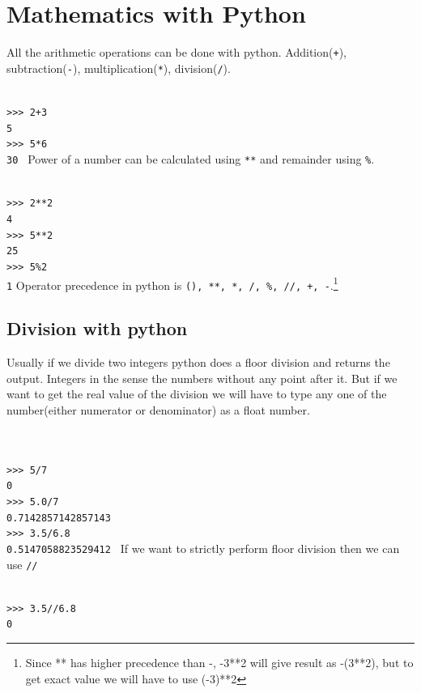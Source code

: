 \documentclass[12pt,a4paper]{article}
\begin{document}
\section{Mathematics with Python}

All the arithmetic operations can be done with python. Addition(\texttt{+}), subtraction(\texttt{-}), multiplication(\texttt{*}), division(\texttt{/}).

\texttt{\\
>>> 2+3\\
5\\
>>> 5*6\\
30
}
\linebreak
\linebreak
Power of a number can be calculated using \texttt{**} and remainder using \texttt{\%}.

\texttt{\\
>>> 2**2\\
4\\
>>> 5**2\\
25\\
>>> 5\%2\\
1}
\linebreak
\linebreak
Operator precedence in python is \texttt{(), **, *, /, \%, //, +, -}.\footnote{Since ** has higher precedence than -, -3**2 will give result as -(3**2), but to get exact value we will have to use (-3)**2}
\subsection{Division with python}
Usually if we divide two integers python does a floor division and returns the output. Integers in the sense the numbers without any point after it. But if we want to get the real value of the division we will have to type any one of the number(either numerator or denominator) as a float number.

\texttt{\\
\\
>>> 5/7\\
0\\
>>> 5.0/7\\
0.7142857142857143\\
>>> 3.5/6.8\\
0.5147058823529412
}
\linebreak
\linebreak
If we want to strictly perform floor division then we can use \texttt{//}

\texttt{\\
>>> 3.5//6.8\\
0
}
\end{document}
